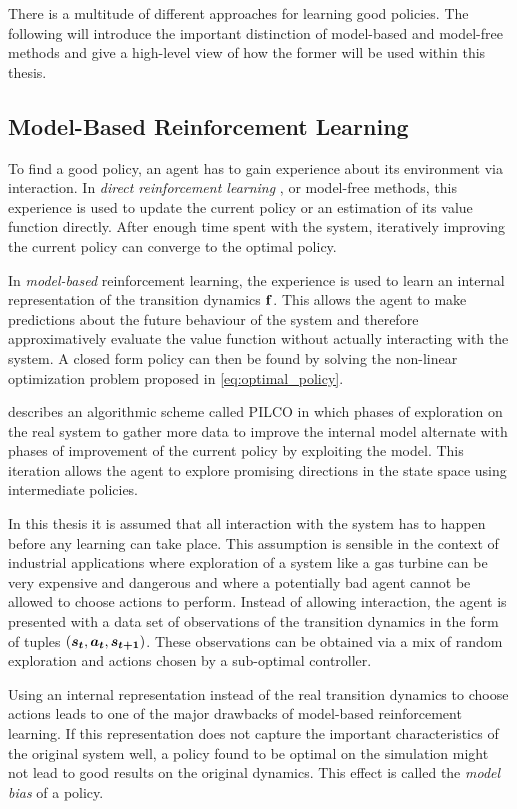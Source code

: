 There is a multitude of different approaches for learning good policies.
The following will introduce the important distinction of model-based and model-free methods and give a high-level view of how the former will be used within this thesis.

\subsection{Model-Based Reinforcement Learning}
To find a good policy, an agent has to gain experience about its environment via interaction.
In \emph{direct reinforcement learning} \cite{sutton_reinforcement_1998}, or model-free methods, this experience is used to update the current policy or an estimation of its value function directly.
After enough time spent with the system, iteratively improving the current policy can converge to the optimal policy.

In \emph{model-based} reinforcement learning, the experience is used to learn an internal representation of the transition dynamics $\operatorname{\mathbf{f}}$.
This allows the agent to make predictions about the future behaviour of the system and therefore approximatively evaluate the value function without actually interacting with the system.
A closed form policy can then be found by solving the non-linear optimization problem proposed in \cref{eq:optimal_policy}.

\citeauthor{deisenroth_efficient_2010} \cite{deisenroth_efficient_2010} describes an algorithmic scheme called PILCO in which phases of exploration on the real system to gather more data to improve the internal model alternate with phases of improvement of the current policy by exploiting the model.
This iteration allows the agent to explore promising directions in the state space using intermediate policies.

In this thesis it is assumed that all interaction with the system has to happen before any learning can take place.
This assumption is sensible in the context of industrial applications where exploration of a system like a gas turbine can be very expensive and dangerous and where a potentially bad agent cannot be allowed to choose actions to perform.
Instead of allowing interaction, the agent is presented with a data set of observations of the transition dynamics in the form of tuples $(\bm{s_t}, \bm{a_t}, \bm{s_{t+1}})$.
These observations can be obtained via a mix of random exploration and actions chosen by a sub-optimal controller.

Using an internal representation instead of the real transition dynamics to choose actions leads to one of the major drawbacks of model-based reinforcement learning.
If this representation does not capture the important characteristics of the original system well, a policy found to be optimal on the simulation might not lead to good results on the original dynamics.
This effect is called the \emph{model bias} of a policy.

